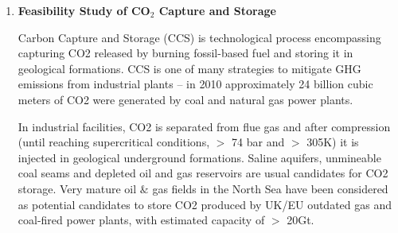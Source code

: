 \documentclass[12pts,a4paper,amsmath,amssymb,floatfix]{article}%
\newcommand{\all}{MSc O$\&$GE, Chemical/Mechanical/Petroleum Engineering}
\begin{document}
\begin{enumerate}[label=\bfseries Project: \arabic*:]
\noindent
{\bf Specifics:} 
\noindent
\begin{enumerate}
\item Theoretical/Review (\all) -- 1 student;
\item The student is required to develop a code (e.g., Matlab, Python etc) for EnKF and apply to synthetic data for data assimilation.
\end{enumerate}

\noindent
{\bf References:}
\begin{itemize}
\item Mata-Lima (2011) $\lq$Evaluation of the Objective Function to Improve Production History Matching Performance based on Fluid Flow Behaviour’, Journal of Petroleum Science and Engineering 78:42-53;
\item Becerra et al. (2012) $\lq$Uncertainty History Matching and Forecasting, a Field Case Application’, SPE 153176-MS;
\item Chitralekha et al.  (2010) $\lq$Application of the EnKF for Characterization and History Matching of Unconventional Oil Reservoirs’, SPE 137480-MS;
\item Schulze-Rigert $\&$ Ghedan (2007) $\lq$Modern Techniques for History Matching’, 9th International Forum on Reservoir Simulation;
\item Hajizadeh et al. (2011) $\lq$Ant Colony Optimization for History Matching and Uncertainty Quantification of Reservoir Models’, Journal of Petroleum Science and Engineering 77:78-92. 
\end{itemize}
%
\clearpage

\item {\bf Feasibility Study of CO$_{2}$ Capture and Storage}

Carbon Capture and Storage (CCS) is technological process encompassing capturing CO2 released by burning fossil-based fuel and storing it in geological formations. CCS is one of many strategies to mitigate GHG emissions from industrial plants – in 2010 approximately 24 billion cubic meters of CO2 were generated by coal and natural gas power plants. 


In industrial facilities, CO2 is separated from flue gas and after compression (until reaching supercritical conditions, $>$ 74 bar and $>$ 305K) it is injected in geological underground formations. Saline aquifers, unmineable coal seams and depleted oil and gas reservoirs are usual candidates for CO2 storage. Very mature oil $\&$ gas fields in the North Sea have been considered as potential candidates to store CO2 produced by UK/EU outdated gas and coal-fired power plants, with estimated capacity of $>$ 20Gt.


\end{enumerate}
\end{document}
